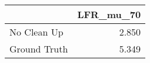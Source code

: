 \begin{tabular}{lr}
\toprule
{} & LFR_mu_70 \\
\midrule
No Clean Up  &     2.850 \\
Ground Truth &     5.349 \\
\bottomrule
\end{tabular}

